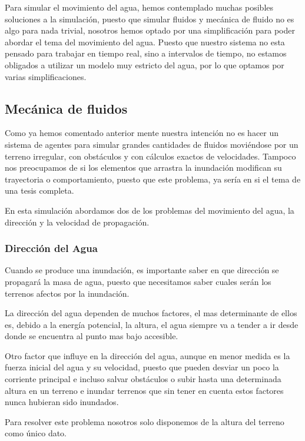 Para simular el movimiento del agua, hemos contemplado muchas posibles
soluciones a la simulación, puesto que simular fluidos y mecánica de fluido no
es algo para nada trivial, nosotros hemos optado por una simplificación para
poder abordar el tema del movimiento del agua. Puesto que nuestro sistema no
esta pensado para trabajar en tiempo real, sino a intervalos de tiempo, no
estamos obligados a utilizar un modelo muy estricto del agua, por lo que optamos
por varias simplificaciones.

\subsection*{Mecánica de fluidos}

Como ya hemos comentado anterior mente nuestra intención no es hacer un sistema
de agentes para simular grandes cantidades de fluidos moviéndose por un terreno
irregular, con obstáculos y con cálculos exactos de velocidades. Tampoco nos
preocupamos de si los elementos que arrastra la inundación modifican su
trayectoria o comportamiento, puesto que este problema, ya sería en si el tema
de una tesis completa.

En esta simulación abordamos dos de los problemas del movimiento del agua, la
dirección y la velocidad de propagación.

\subsubsection*{Dirección del Agua}

Cuando se produce una inundación, es importante saber en que dirección se
propagará la masa de agua, puesto que necesitamos saber cuales serán los
terrenos afectos por la inundación.

La dirección del agua dependen de muchos factores, el mas determinante de ellos
es, debido a la energía potencial, la altura, el agua siempre va a tender a ir
desde donde se encuentra al punto mas bajo accesible.

Otro factor que influye en la dirección del agua, aunque en menor medida es la
fuerza inicial del agua y su velocidad, puesto que pueden desviar un poco la
corriente principal e incluso salvar obstáculos o subir hasta una determinada
altura en un terreno e inundar terrenos que sin tener en cuenta estos factores
nunca hubieran sido inundados.

Para resolver este problema nosotros solo disponemos de la altura del terreno
como único dato.

